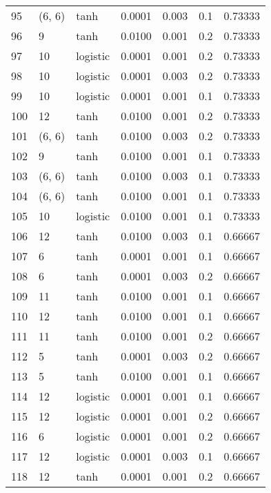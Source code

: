 \begin{tabular}{lllrrrr}
95  &      (6, 6) &      tanh &  0.0001 &  0.003 &  0.1 &   0.73333 \\
96  &           9 &      tanh &  0.0100 &  0.001 &  0.2 &   0.73333 \\
97  &          10 &  logistic &  0.0001 &  0.001 &  0.2 &   0.73333 \\
98  &          10 &  logistic &  0.0001 &  0.003 &  0.2 &   0.73333 \\
99  &          10 &  logistic &  0.0001 &  0.001 &  0.1 &   0.73333 \\
100 &          12 &      tanh &  0.0100 &  0.001 &  0.2 &   0.73333 \\
101 &      (6, 6) &      tanh &  0.0100 &  0.003 &  0.2 &   0.73333 \\
102 &           9 &      tanh &  0.0100 &  0.001 &  0.1 &   0.73333 \\
103 &      (6, 6) &      tanh &  0.0100 &  0.003 &  0.1 &   0.73333 \\
104 &      (6, 6) &      tanh &  0.0100 &  0.001 &  0.1 &   0.73333 \\
105 &          10 &  logistic &  0.0100 &  0.001 &  0.1 &   0.73333 \\
106 &          12 &      tanh &  0.0100 &  0.003 &  0.1 &   0.66667 \\
107 &           6 &      tanh &  0.0001 &  0.001 &  0.1 &   0.66667 \\
108 &           6 &      tanh &  0.0001 &  0.003 &  0.2 &   0.66667 \\
109 &          11 &      tanh &  0.0100 &  0.001 &  0.1 &   0.66667 \\
110 &          12 &      tanh &  0.0100 &  0.001 &  0.1 &   0.66667 \\
111 &          11 &      tanh &  0.0100 &  0.001 &  0.2 &   0.66667 \\
112 &           5 &      tanh &  0.0001 &  0.003 &  0.2 &   0.66667 \\
113 &           5 &      tanh &  0.0100 &  0.001 &  0.1 &   0.66667 \\
114 &          12 &  logistic &  0.0001 &  0.001 &  0.1 &   0.66667 \\
115 &          12 &  logistic &  0.0001 &  0.001 &  0.2 &   0.66667 \\
116 &           6 &  logistic &  0.0001 &  0.001 &  0.2 &   0.66667 \\
117 &          12 &  logistic &  0.0001 &  0.003 &  0.1 &   0.66667 \\
118 &          12 &      tanh &  0.0001 &  0.001 &  0.2 &   0.66667 \\

\end{tabular}
